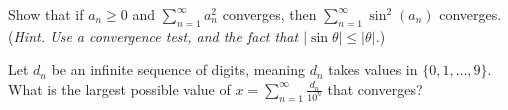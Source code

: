 \documentclass[12pt]{amsart}
\newcommand{\ds}{\displaystyle}
\begin{document}
 \begin{minipage}[t]{5.5in} Show that if $a_n \ge 0$ and $\ds \sum_{n=1}^\infty a_n^2$ converges, then $\ds \sum_{n=1}^\infty \sin^2(a_n)$ converges.  (\emph{Hint. Use a convergence test, and the fact that $|\sin \theta| \le |\theta|$.})
\end{minipage}

 \begin{minipage}[t]{5.5in} Let $d_n$ be an infinite sequence of digits, meaning $d_n$ takes values in $\{0,1,\dots,9\}$.  What is the largest possible value of $\ds x = \sum_{n=1}^\infty \frac{d_n}{10^n}$ that converges?
\end{minipage}
\end{document}
